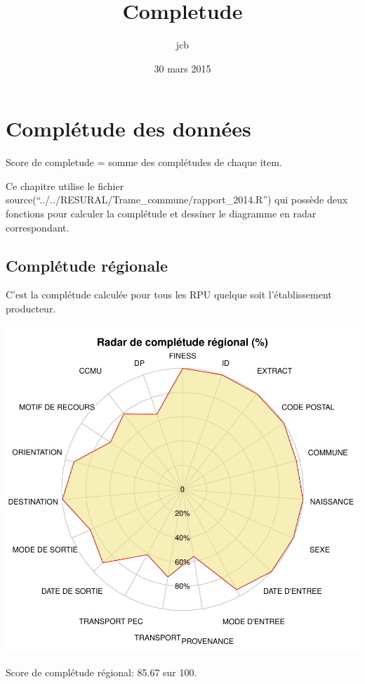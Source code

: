 \documentclass[]{article}
\title{Completude}
\author{jcb}
\date{30 mars 2015}
\begin{document}
\maketitle


{
\hypersetup{linkcolor=black}
\setcounter{tocdepth}{2}
\tableofcontents
}
\section{Complétude des données}\label{completude-des-donnees}

Score de completude = somme des complétudes de chaque item.

Ce chapitre utilise le fichier
source(``../../RESURAL/Trame\_commune/rapport\_2014.R'') qui possède
deux fonctions pour calculer la complétude et dessiner le diagramme en
radar correspondant.

\subsection{Complétude régionale}\label{completude-regionale}

C'est la complétude calculée pour tous les RPU quelque soit
l'établissement producteur.

\includegraphics{completude_files/figure-latex/comp_regionale-1.pdf}

Score de complétude régional: 85.67 sur 100.
\end{document}
